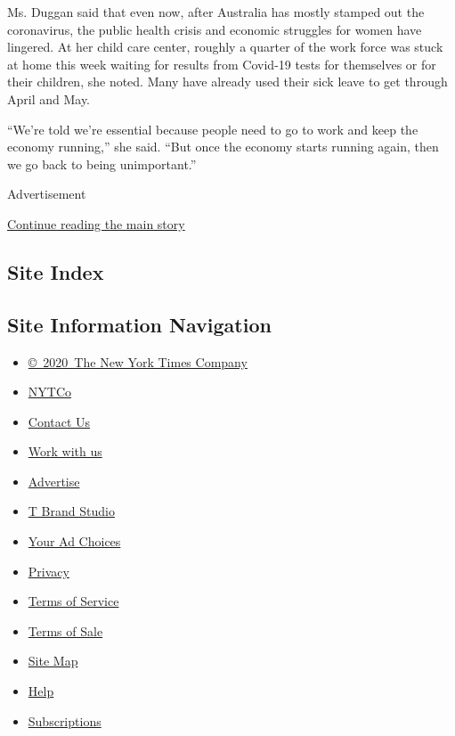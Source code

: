 Ms. Duggan said that even now, after Australia has mostly stamped out
the coronavirus, the public health crisis and economic struggles for
women have lingered. At her child care center, roughly a quarter of the
work force was stuck at home this week waiting for results from Covid-19
tests for themselves or for their children, she noted. Many have already
used their sick leave to get through April and May.

``We're told we're essential because people need to go to work and keep
the economy running,'' she said. ``But once the economy starts running
again, then we go back to being unimportant.''

Advertisement

\protect\hyperlink{after-bottom}{Continue reading the main story}

\hypertarget{site-index}{%
\subsection{Site Index}\label{site-index}}

\hypertarget{site-information-navigation}{%
\subsection{Site Information
Navigation}\label{site-information-navigation}}

\begin{itemize}
\tightlist
\item
  \href{https://help.nytimes.com/hc/en-us/articles/115014792127-Copyright-notice}{©~2020~The
  New York Times Company}
\end{itemize}

\begin{itemize}
\tightlist
\item
  \href{https://www.nytco.com/}{NYTCo}
\item
  \href{https://help.nytimes.com/hc/en-us/articles/115015385887-Contact-Us}{Contact
  Us}
\item
  \href{https://www.nytco.com/careers/}{Work with us}
\item
  \href{https://nytmediakit.com/}{Advertise}
\item
  \href{http://www.tbrandstudio.com/}{T Brand Studio}
\item
  \href{https://www.nytimes.com/privacy/cookie-policy\#how-do-i-manage-trackers}{Your
  Ad Choices}
\item
  \href{https://www.nytimes.com/privacy}{Privacy}
\item
  \href{https://help.nytimes.com/hc/en-us/articles/115014893428-Terms-of-service}{Terms
  of Service}
\item
  \href{https://help.nytimes.com/hc/en-us/articles/115014893968-Terms-of-sale}{Terms
  of Sale}
\item
  \href{https://spiderbites.nytimes.com}{Site Map}
\item
  \href{https://help.nytimes.com/hc/en-us}{Help}
\item
  \href{https://www.nytimes.com/subscription?campaignId=37WXW}{Subscriptions}
\end{itemize}
